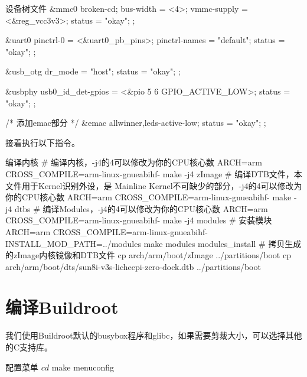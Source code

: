 \documentclass[lang=cn,newtx,10pt,scheme=chinese]{elegantbook}
\begin{document}
\begin{mycode}{设备树文件}
&mmc0 {
    broken-cd;
    bus-width = <4>;
    vmmc-supply = <&reg_vcc3v3>;
    status = "okay";
};

&uart0 {
    pinctrl-0 = <&uart0_pb_pins>;
    pinctrl-names = "default";
    status = "okay";
};

&usb_otg {
    dr_mode = "host";
    status = "okay";
};

&usbphy {
    usb0_id_det-gpios = <&pio 5 6 GPIO_ACTIVE_LOW>;
    status = "okay";
};

/* 添加emac部分 */
&emac {
    allwinner,leds-active-low;
    status = "okay";
};
\end{mycode}


接着执行以下指令。

\begin{mycode}{编译内核}
# 编译内核，-j4的4可以修改为你的CPU核心数
ARCH=arm CROSS_COMPILE=arm-linux-gnueabihf- make -j4 zImage
# 编译DTB文件，本文件用于Kernel识别外设，是 Mainline Kernel不可缺少的部分，-j4的4可以修改为你的CPU核心数
ARCH=arm CROSS_COMPILE=arm-linux-gnueabihf- make -j4 dtbs
# 编译Modules，-j4的4可以修改为你的CPU核心数
ARCH=arm CROSS_COMPILE=arm-linux-gnueabihf- make -j4 modules
# 安装模块
ARCH=arm CROSS_COMPILE=arm-linux-gnueabihf- INSTALL_MOD_PATH=../modules  make modules modules_install
# 拷贝生成的zImage内核镜像和DTB文件
cp arch/arm/boot/zImage ../partitions/boot
cp arch/arm/boot/dts/sun8i-v3s-licheepi-zero-dock.dtb ../partitions/boot
\end{mycode}

\section{编译Buildroot}

我们使用Buildroot默认的busybox程序和glibc，如果需要剪裁大小，可以选择其他的C支持库。

\begin{mycode}{配置菜单}
$ cd
$ make menuconfig
\end{mycode}
\end{document}

